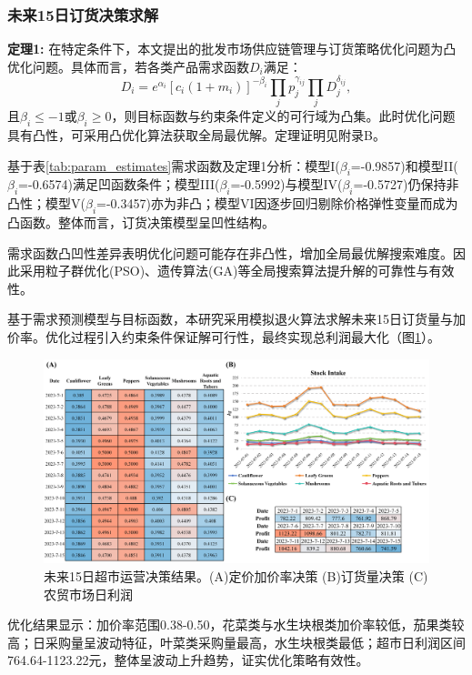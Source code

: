 \documentclass[lang=cn,12pt,a4paper]{elegantpaper}
\begin{document}
\subsubsection{未来15日订货决策求解}
\label{subsubsec:ordering_decision_15_days}

\textbf{定理1:} 在特定条件下，本文提出的批发市场供应链管理与订货策略优化问题为凸优化问题。具体而言，若各类产品需求函数$D_i$满足：
\begin{equation}
D_i = e^{\alpha_i} \left[ c_i (1 + m_i) \right]^{-\beta_i} \prod_j p_j^{\gamma_{ij}} \prod_j D_j^{\delta_{ij}},
\end{equation}
且$\beta_i \leq -1$或$\beta_i \geq 0$，则目标函数与约束条件定义的可行域为凸集。此时优化问题具有凸性，可采用凸优化算法获取全局最优解。定理证明见附录B。

基于表\ref{tab:param_estimates}需求函数及定理1分析：模型I($\beta_i$=-0.9857)和模型II($\beta_i$=-0.6574)满足凹函数条件；模型III($\beta_i$=-0.5992)与模型IV($\beta_i$=-0.5727)仍保持非凸性；模型V($\beta_i$=-0.3457)亦为非凸；模型VI因逐步回归剔除价格弹性变量而成为凸函数。整体而言，订货决策模型呈凹性结构。

需求函数凸凹性差异表明优化问题可能存在非凸性，增加全局最优解搜索难度。因此采用粒子群优化(PSO)、遗传算法(GA)等全局搜索算法提升解的可靠性与有效性。

基于需求预测模型与目标函数，本研究采用模拟退火算法\citep{Tavares2011}求解未来15日订货量与加价率。优化过程引入约束条件保证解可行性，最终实现总利润最大化（图\ref{fig:fig6}）。

\begin{figure}[H]
    \centering
    \includegraphics[width=1\textwidth]{图片6.png}
    \caption{未来15日超市运营决策结果。(A)定价加价率决策 (B)订货量决策 (C)农贸市场日利润}
    \label{fig:fig6}
\end{figure}

优化结果显示：加价率范围0.38-0.50，花菜类与水生块根类加价率较低，茄果类较高；日采购量呈波动特征，叶菜类采购量最高，水生块根类最低；超市日利润区间764.64-1123.22元，整体呈波动上升趋势，证实优化策略有效性。
\end{document}
